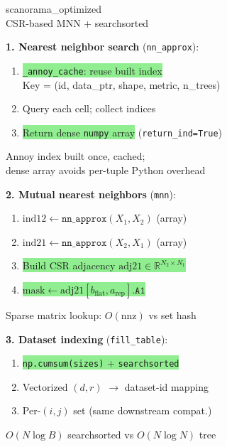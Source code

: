 \documentclass[8pt]{article}
\newlength{\colw}
\begin{document}
\begin{minipage}[t]{\colw}
\begin{tcolorbox}[colback=hdrB, colframe=hdrB, fontupper=\bfseries\footnotesize\color{white},
    arc=2pt, left=2pt, right=2pt, top=1pt, bottom=1pt]
\centering scanorama\_optimized\\[-2pt]
{\scriptsize\mdseries CSR-based MNN + searchsorted}
\end{tcolorbox}
\vspace{1pt}

\begin{keyboxG}
\textbf{1. Nearest neighbor search} (\texttt{nn\_approx}):
\begin{enumerate}[leftmargin=1em, itemsep=0pt, topsep=1pt, parsep=0pt]
\item \colorbox{lightgreen}{\texttt{\_annoy\_cache}: reuse built index}\\
    {\scriptsize Key = (id, data\_ptr, shape, metric, n\_trees)}
\item Query each cell; collect indices
\item \colorbox{lightgreen}{Return dense \texttt{numpy} array} (\texttt{return\_ind=True})
\end{enumerate}
{\scriptsize\color{added} Annoy index built once, cached;\\
dense array avoids per-tuple Python overhead}
\end{keyboxG}\vspace{1pt}

\begin{keyboxG}
\textbf{2. Mutual nearest neighbors} (\texttt{mnn}):
\begin{enumerate}[leftmargin=1em, itemsep=0pt, topsep=1pt, parsep=0pt]
\item $\text{ind12} \gets \texttt{nn\_approx}(X_1, X_2)$ {\scriptsize (array)}
\item $\text{ind21} \gets \texttt{nn\_approx}(X_2, X_1)$ {\scriptsize (array)}
\item \colorbox{lightgreen}{Build CSR adjacency $\text{adj21} \in \mathbb{R}^{N_2 \times N_1}$}
\item \colorbox{lightgreen}{$\text{mask} \gets \text{adj21}[b_\text{flat}, a_\text{rep}]\texttt{.A1}$}
\end{enumerate}
{\scriptsize\color{added} Sparse matrix lookup: $O(\text{nnz})$ vs set hash}
\end{keyboxG}\vspace{1pt}

\begin{keyboxG}
\textbf{3. Dataset indexing} (\texttt{fill\_table}):
\begin{enumerate}[leftmargin=1em, itemsep=0pt, topsep=1pt, parsep=0pt]
\item \colorbox{lightgreen}{\texttt{np.cumsum(sizes)} + \texttt{searchsorted}}
\item Vectorized $(d, r)$ $\to$ dataset-id mapping
\item Per-$(i,j)$ set (same downstream compat.)
\end{enumerate}
{\scriptsize\color{added} $O(N\log B)$ searchsorted vs $O(N\log N)$ tree}
\end{keyboxG}\vspace{1pt}


\end{minipage}
\end{document}
